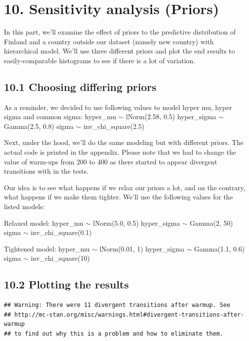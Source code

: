 \documentclass[
]{article}
\begin{document}
\hypertarget{sensitivity-analysis-priors}{%
\section{10. Sensitivity analysis
(Priors)}\label{sensitivity-analysis-priors}}

In this part, we'll examine the effect of priors to the predictive
distribution of Finland and a country outside our dataset (namely new
country) with hierarchical model. We'll use three different priors and
plot the end results to easily-comparable histograms to see if there is
a lot of variation.

\hypertarget{choosing-differing-priors}{%
\subsection{10.1 Choosing differing
priors}\label{choosing-differing-priors}}

As a reminder, we decided to use following values to model hyper mu,
hyper sigma and common sigma: hyper\_mu \(\sim\) lNorm(2.58, 0.5)
hyper\_sigma \(\sim\) Gamma(2.5, 0.8) sigma \(\sim\)
inv\_chi\_square(2.5)

Next, under the hood, we'll do the same modeling but with different
priors. The actual code is printed in the appendix. Please note that we
had to change the value of warm-ups from 200 to 400 as there started to
appear divergent transitions with in the tests.

Our idea is to see what happens if we relax our priors a lot, and on the
contrary, what happens if we make them tighter. We'll use the following
values for the listed models:

Relaxed model: hyper\_mu \(\sim\) lNorm(5.0, 0.5) hyper\_sigma \(\sim\)
Gamma(2, 50) sigma \(\sim\) inv\_chi\_square(0.1)

Tightened model: hyper\_mu \(\sim\) lNorm(0.01, 1) hyper\_sigma \(\sim\)
Gamma(1.1, 0.6) sigma \(\sim\) inv\_chi\_square(10)

\hypertarget{plotting-the-results}{%
\subsection{10.2 Plotting the results}\label{plotting-the-results}}

\begin{verbatim}
## Warning: There were 11 divergent transitions after warmup. See
## http://mc-stan.org/misc/warnings.html#divergent-transitions-after-warmup
## to find out why this is a problem and how to eliminate them.
\end{verbatim}
\end{document}
